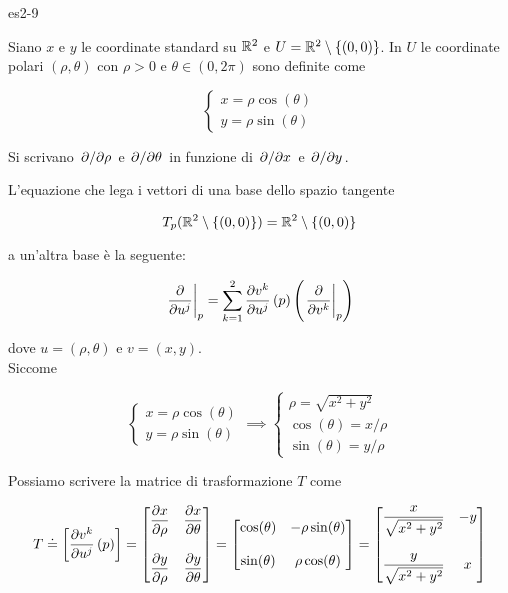 {es2-9}
{
Siano $ x $ e $ y $ le coordinate standard su $ \mathbb{R}^{2} $ e $ U = \mathbb{R}^{2} \setminus \{(0,0)\} $. In $ U $ le coordinate polari $ (\rho, \theta) $ con $ \rho > 0 $ e $ \theta \in (0,2\pi) $ sono definite come

\begin{equation}
	\begin{cases}
		x = \rho \cos(\theta) \\
		y = \rho \sin(\theta)
	\end{cases}
\end{equation}

Si scrivano $ \pdv*{\rho} $ e $ \pdv*{\theta} $ in funzione di $ \pdv*{x} $ e $ \pdv*{y} $.
}
{
L'equazione che lega i vettori di una base dello spazio tangente

\begin{equation}
	T_{p}(\mathbb{R}^{2} \setminus \{(0,0)\}) = \mathbb{R}^{2} \setminus \{(0,0)\}
\end{equation}

a un'altra base è la seguente:

\begin{equation}
	\eval{\pdv{u^{j}}}_{p} = \sum_{k=1}^{2} \pdv{v^{k}}{u^{j}} \, (p) \left( \eval{\pdv{v^{k}}}_{p} \right)
\end{equation}

dove $ u = (\rho,\theta) $ e $ v = (x,y) $. \\
Siccome

\begin{equation}
	\begin{cases}
		x = \rho \cos(\theta) \\
		y = \rho \sin(\theta)
	\end{cases}%
	\implies %
	\begin{cases}
		\rho = \sqrt{x^{2} + y^{2}} \\
		\cos(\theta) = x / \rho \\
		\sin(\theta) = y / \rho
	\end{cases}
\end{equation}

Possiamo scrivere la matrice di trasformazione $ T $ come

\begin{equation}
	T \doteq \left[ \pdv{v^{k}}{u^{j}} \, (p) \right] = \bmqty{ \dpdv{x}{\rho} & \dpdv{x}{\theta} \\ \\ \dpdv{y}{\rho} & \dpdv{y}{\theta} } %
	= \bmqty{ \cos(\theta) & - \rho \sin(\theta) \\ \\ \sin(\theta) & \rho \cos(\theta) } %
	= \bmqty{ \dfrac{x}{\sqrt{x^{2} + y^{2}}} & - y \\ \\ \dfrac{y}{\sqrt{x^{2} + y^{2}}} & x }
\end{equation}

}
